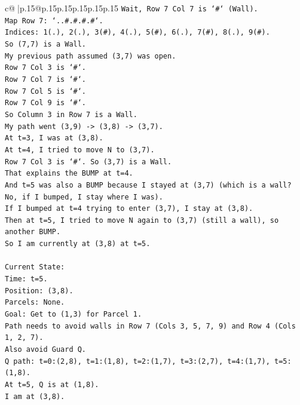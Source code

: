 \documentclass{article}
\begin{document}
{\begin{supertabular}{c@{$\;$}|p{.15\linewidth}@{}p{.15\linewidth}p{.15\linewidth}p{.15\linewidth}p{.15\linewidth}p{.15\linewidth}}
{{{\texttt{Wait, Row 7 Col 7 is `\#` (Wall).} \\
\texttt{Map Row 7: `..\#.\#.\#.\#`.} \\
\texttt{Indices: 1(.), 2(.), 3(\#), 4(.), 5(\#), 6(.), 7(\#), 8(.), 9(\#).} \\
\texttt{So (7,7) is a Wall.} \\
\texttt{My previous path assumed (3,7) was open.} \\
\texttt{Row 7 Col 3 is `\#`.} \\
\texttt{Row 7 Col 7 is `\#`.} \\
\texttt{Row 7 Col 5 is `\#`.} \\
\texttt{Row 7 Col 9 is `\#`.} \\
\texttt{So Column 3 in Row 7 is a Wall.} \\
\texttt{My path went (3,9) {-}> (3,8) {-}> (3,7).} \\
\texttt{At t=3, I was at (3,8).} \\
\texttt{At t=4, I tried to move N to (3,7).} \\
\texttt{Row 7 Col 3 is `\#`. So (3,7) is a Wall.} \\
\texttt{That explains the BUMP at t=4.} \\
\texttt{And t=5 was also a BUMP because I stayed at (3,7) (which is a wall? No, if I bumped, I stay where I was).} \\
\texttt{If I bumped at t=4 trying to enter (3,7), I stay at (3,8).} \\
\texttt{Then at t=5, I tried to move N again to (3,7) (still a wall), so another BUMP.} \\
\texttt{So I am currently at (3,8) at t=5.} \\
\\ 
\texttt{Current State:} \\
\texttt{Time: t=5.} \\
\texttt{Position: (3,8).} \\
\texttt{Parcels: None.} \\
\texttt{Goal: Get to (1,3) for Parcel 1.} \\
\texttt{Path needs to avoid walls in Row 7 (Cols 3, 5, 7, 9) and Row 4 (Cols 1, 2, 7).} \\
\texttt{Also avoid Guard Q.} \\
\texttt{Q path: t=0:(2,8), t=1:(1,8), t=2:(1,7), t=3:(2,7), t=4:(1,7), t=5:(1,8).} \\
\texttt{At t=5, Q is at (1,8).} \\
\texttt{I am at (3,8).} \\
}}}
\end{supertabular}}
\end{document}
